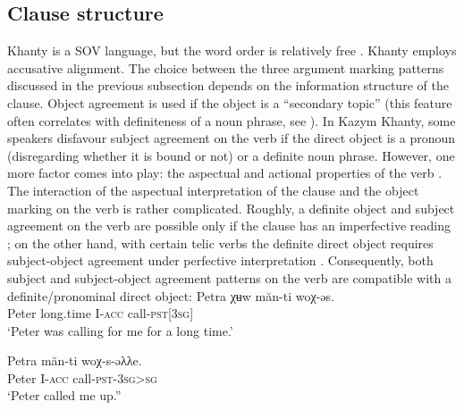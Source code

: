 \documentclass[output=paper]{langscibook}
\begin{document}
\subsection{{Clause} {structure}}\label{sec:Volkova:2.4}

Khanty is a SOV language, but the word order is relatively free \citep{Nikolaeva1999Ostyak}. Khanty employs accusative alignment. The choice between the three argument marking patterns discussed in the previous subsection depends on the information structure of the clause. Object agreement is used if the object is a “secondary topic” (this feature often correlates with definiteness of a noun phrase, see \citealt{Nikolaeva1999Agreement}). In Kazym Khanty, some speakers disfavour subject agreement on the verb if the direct object is a pronoun (disregarding whether it is bound or not) or a definite noun phrase. However, one more factor comes into play: the aspectual and actional properties of the verb \citep{Kozlov2019}. The interaction of the aspectual interpretation of the clause and the object marking on the verb is rather complicated. Roughly, a definite object and subject agreement on the verb are possible only if the clause has an imperfective reading ; on the other hand, with certain telic verbs the definite direct object%
 requires subject-object agreement under perfective interpretation . Consequently, both subject and subject-object agreement patterns on the verb are compatible with a definite/pronominal direct object:
\ea 
\label{ex:Volkova:10}
	\ea
	\label{ex:Volkova:10a}
  	 \gll Petra χʉw măn-ti woχ-əs.\\
  	 Peter long.time I\textsc{{}-acc} call{}-\textsc{pst[3sg]}\\
  	 \glt ‘Peter was calling for me for a long time.’

	\ex
	\label{ex:Volkova:10b}
  	 \gll Petra măn-ti woχ-s-əλλe.\\
  	 Peter I\textsc{{}-acc} call\textsc{{}-pst-3sg>sg}\\
  	 \glt ‘Peter called me up.”
	\z
\z
\end{document}
